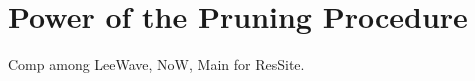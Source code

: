 


\section{Power of the Pruning Procedure} %
\label{s:power_of_the_pruning_procedure}

Comp among LeeWave, NoW, Main for ResSite.


%
%